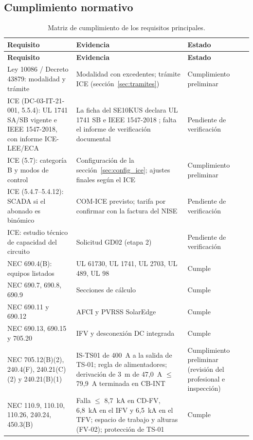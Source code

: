 \documentclass[12pt]{article}
\begin{document}
\subsection{Cumplimiento normativo}
{\small
\begin{longtable}{L{4.0cm}L{8.2cm}L{2.6cm}}
\caption{Matriz de cumplimiento de los requisitos principales.}\label{tab:cumplimiento}\\
\toprule
\textbf{Requisito} & \textbf{Evidencia} & \textbf{Estado}\\
\midrule\endfirsthead
\toprule
\textbf{Requisito} & \textbf{Evidencia} & \textbf{Estado}\\
\midrule\endhead
Ley 10086 / Decreto 43879: modalidad y trámite & Modalidad con excedentes; trámite ICE (sección~\ref{sec:tramites}) & Cumplimiento preliminar\\
ICE (DC-03-IT-21-001, 5.5.4): UL 1741 SA/SB vigente e IEEE 1547-2018, con informe ICE-LEE/ECA & La ficha del SE10KUS declara UL 1741 SB e IEEE 1547-2018 \cite{seInv}; falta el informe de verificación documental & Pendiente de verificación\\
ICE (5.7): categoría B y modos de control & Configuración de la sección~\ref{sec:config_ice}; ajustes finales según el ICE & Cumplimiento preliminar\\
ICE (5.4.7--5.4.12): SCADA si el abonado es binómico & COM-ICE previsto; tarifa por confirmar con la factura del NISE & Pendiente de verificación\\
ICE: estudio técnico de capacidad del circuito & Solicitud GD02 (etapa 2) & Pendiente de verificación\\
NEC 690.4(B): equipos listados & UL 61730, UL 1741, UL 2703, UL 489, UL 98 & Cumple\\
NEC 690.7, 690.8, 690.9 & Secciones de cálculo & Cumple\\
NEC 690.11 y 690.12 & AFCI y PVRSS SolarEdge & Cumple\\
NEC 690.13, 690.15 y 705.20 & IFV y desconexión DC integrada & Cumple\\
NEC 705.12(B)(2), 240.4(F), 240.21(C)(2) y 240.21(B)(1) & IS-TS01 de 400~A a la salida de TS-01; regla de alimentadores; derivación de 3~m de 47,0~A $\leq$ 79,9~A terminada en CB-INT & Cumplimiento preliminar (revisión del profesional e inspección)\\
NEC 110.9, 110.10, 110.26, 240.24, 450.3(B) & Falla $\leq$ 8,7~kA en CD-FV, 6,8~kA en el IFV y 6,5~kA en el TFV; espacio de trabajo y alturas (FV-02); protección de TS-01 & Cumple\\

\end{longtable}}
\end{document}
